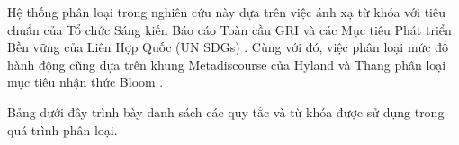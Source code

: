 
\label{appendix:grounded_rules}

Hệ thống phân loại trong nghiên cứu này dựa trên việc ánh xạ từ khóa với tiêu chuẩn của Tổ chức Sáng kiến Báo cáo Toàn cầu GRI \cite{gri2021gri} và các Mục tiêu Phát triển Bền vững của Liên Hợp Quốc (UN SDGs) \cite{un_sdgs_2015}. Cùng với đó, việc phân loại mức độ hành động cũng dựa trên khung Metadiscourse của Hyland \cite{rodina2007metadiscourse} và Thang phân loại mục tiêu nhận thức Bloom \cite{anderson2001taxonomy}.

Bảng dưới đây trình bày danh sách các quy tắc và từ khóa được sử dụng trong quá trình phân loại.

\renewcommand{\arraystretch}{1.3}
\small



